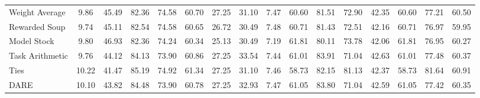 \begin{table*}
{\begin{tabular}{lcccccccc|c|cc|cccc}
      Weight Average                         & 9.86                                      & 45.49            & 82.36                                      & 74.58                                  & 60.70                                 & 27.25                                   & 31.10                         & 7.47     & 60.60           & 81.51           & 72.90       & 42.35 & 60.60 & 77.21 & 60.50             \\
      Rewarded Soup                          & 9.74                                      & 45.11            & 82.54                                      & 74.58                                  & 60.65                                 & 26.72                                   & 30.49                         & 7.48     & 60.71           & 81.43           & 72.51       & 42.16 & 60.71 & 76.97 & 59.95             \\
      Model Stock                            & 9.80                                      & 46.93            & 82.36                                      & 74.24                                  & 60.34                                 & 25.13                                   & 30.49                         & 7.19     & 61.81           & 80.11           & 73.78       & 42.06 & 61.81 & 76.95 & 60.27             \\
      Task Arithmetic                        & 9.76                                      & 44.12            & 84.13                                      & 73.90                                  & 60.86                                 & 27.25                                   & 33.54                         & 7.44     & 61.01           & 83.91           & 71.04       & 42.63 & 61.01 & 77.48 & 60.37             \\
      Ties                                   & 10.22                                     & 41.47            & 85.19                                      & 74.92                                  & 61.34                                 & 27.25                                   & 31.10                         & 7.46     & 58.73           & 82.15           & 81.13       & 42.37 & 58.73 & 81.64 & 60.91             \\
      DARE                                   & 10.10                                     & 43.82            & 84.48                                      & 73.90                                  & 60.78                                 & 27.25                                   & 32.93                         & 7.47     & 61.05           & 83.80           & 71.04       & 42.59 & 61.05 & 77.42 & 60.35             \\

\end{tabular}}
\end{table*}

